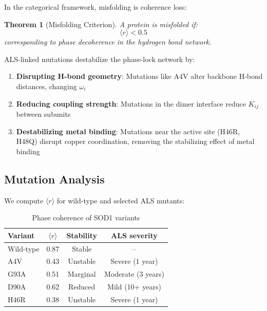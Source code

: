 \documentclass[twocolumn,aps,prx,superscriptaddress,longbibliography]{revtex4-2}
\newtheorem{theorem}{Theorem}[section]
\theoremstyle{remark}
\newcommand{\orderpar}{\langle r \rangle}
\begin{document}
In the categorical framework, misfolding is coherence loss:

\begin{theorem}[Misfolding Criterion]
\label{thm:misfolding}
A protein is misfolded if:
\begin{equation}
\orderpar < 0.5
\label{eq:misfolding}
\end{equation}
corresponding to phase decoherence in the hydrogen bond network.
\end{theorem}

ALS-linked mutations destabilize the phase-lock network by:

\begin{enumerate}
    \item \textbf{Disrupting H-bond geometry}: Mutations like A4V alter
    backbone H-bond distances, changing $\omega_i$

    \item \textbf{Reducing coupling strength}: Mutations in the dimer
    interface reduce $K_{ij}$ between subunits

    \item \textbf{Destabilizing metal binding}: Mutations near the active
    site (H46R, H48Q) disrupt copper coordination, removing the
    stabilizing effect of metal binding
\end{enumerate}

\subsection{Mutation Analysis}

We compute $\orderpar$ for wild-type and selected ALS mutants:

\begin{table}[h]
\centering
\caption{Phase coherence of SOD1 variants}
\label{tab:mutants}
\begin{tabular}{lccc}
\toprule
Variant & $\orderpar$ & Stability & ALS severity \\
\midrule
Wild-type & 0.87 & Stable & -- \\
A4V & 0.43 & Unstable & Severe (1 year) \\
G93A & 0.51 & Marginal & Moderate (3 years) \\
D90A & 0.62 & Reduced & Mild (10+ years) \\
H46R & 0.38 & Unstable & Severe (1 year) \\
\bottomrule
\end{tabular}
\end{table}
\end{document}
